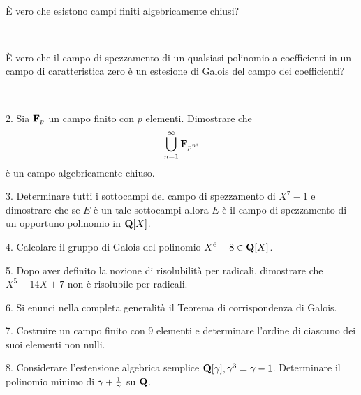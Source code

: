 \ \dotfill\ \bigskip\bigskip\bigskip\vfil

 \`E vero che esistono campi finiti algebricamente chiusi?\medskip\bigskip\bigskip

\ \dotfill\ \bigskip\bigskip\bigskip

 \`E vero che il campo di spezzamento di un qualsiasi polinomio a coefficienti in un campo
di caratteristica zero \`e un estesione di Galois del campo dei coefficienti?\medskip\bigskip\bigskip

\ \dotfill\ \bigskip\bigskip\bigskip

\vfil\eject


\item{2.} Sia ${\bf F}_p$ un campo finito con $p$ elementi. Dimostrare che 
$$\bigcup_{n=1}^\infty{\bf F}_{p^{n!}}$$
\`e un campo algebricamente chiuso.

\vv


\item{3.} Determinare tutti i sottocampi del campo di spezzamento di $X^7-1$ e dimostrare che se 
$E$ \`e un tale sottocampi allora $E$ \`e il campo di spezzamento di un opportuno polinomio in ${\bf Q}[X]$.
\ve\ \vs


\item{4.} Calcolare il gruppo di Galois del polinomio $X^6-8\in{\bf Q}[X]$. \vv

\item{5.} Dopo aver definito la nozione di risolubilit\`a per radicali, dimostrare che $X^5-14X+7$
non \`e risolubile per radicali.
\ve\ \vs


\item{6.} Si enunci nella completa generalit\`a il Teorema di
corrispondenza di Galois.\vskip 6cm\bigskip\bigskip\bigskip\vv\vv


\item{7.} Costruire un campo finito con $9$ elementi e determinare l'ordine di ciascuno dei suoi elementi non nulli.\vskip 6cm\bigskip\bigskip\bigskip\vv\vv

\item{8.} Considerare l'estensione algebrica semplice ${\bf Q}[\gamma], \gamma^3=\gamma-1$. 
Determinare il polinomio minimo di $\gamma+{1\over\gamma}$ su ${\bf Q}$.


\vv

\ \vst
 \bye
